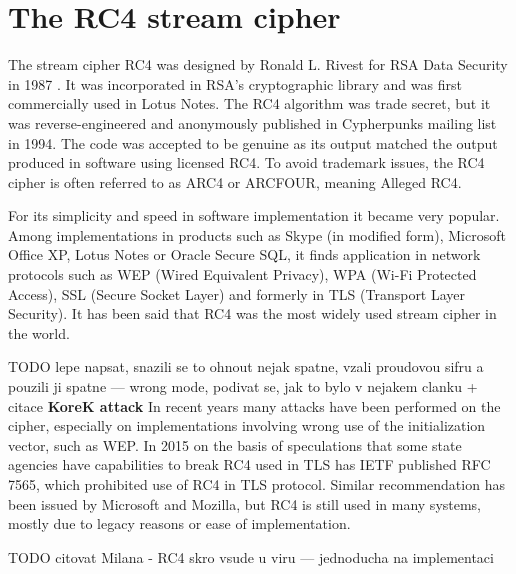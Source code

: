 \chapter{The RC4 stream cipher}
The stream cipher RC4 was designed by Ronald L. Rivest for RSA Data Security in 1987 \cite{RS14}. It was incorporated in RSA's cryptographic library and was first commercially used in Lotus Notes. The RC4 algorithm was trade secret, but it was reverse-engineered and anonymously published in Cypherpunks mailing list  \cite{cypherpunks} in 1994. The code was accepted to be genuine as its output matched the output produced in software using licensed RC4. To avoid trademark issues, the RC4 cipher is often referred to as ARC4 or ARCFOUR, meaning Alleged RC4. 

For its simplicity and speed in software implementation it became very popular. Among implementations in products such as Skype (in modified form), Microsoft Office XP, Lotus Notes or Oracle Secure SQL, it finds application in network protocols such as WEP (Wired Equivalent Privacy), WPA (Wi-Fi Protected Access), SSL (Secure Socket Layer) and formerly in TLS (Transport Layer Security). It has been said that RC4 was the most widely used stream cipher in the world. 


TODO lepe napsat, snazili se to ohnout nejak spatne, vzali proudovou sifru a pouzili ji spatne --- wrong mode, podivat se, jak to bylo v nejakem clanku + citace \textbf{KoreK attack}
In recent years many attacks have been performed on the cipher, especially on implementations involving wrong use of the initialization vector, such as WEP. In 2015 on the basis of speculations that some state agencies have capabilities to break RC4 used in TLS has IETF published RFC 7565, which prohibited use of RC4 in TLS protocol. Similar recommendation has been issued by Microsoft and Mozilla, but RC4 is still used in many systems, mostly due to legacy reasons or ease of implementation. 

TODO citovat Milana - RC4 skro vsude u viru --- jednoducha na implementaci


